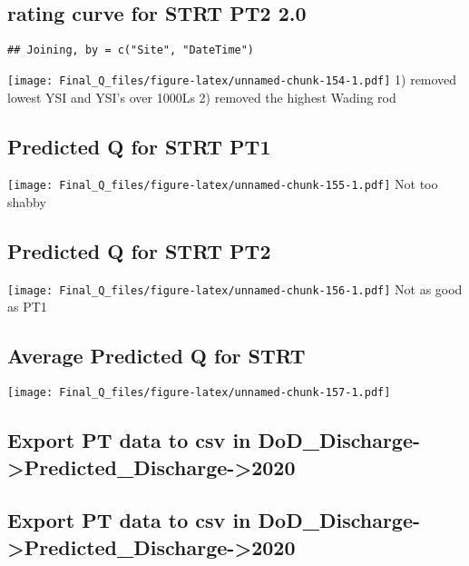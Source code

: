 \documentclass[
]{article}
\begin{document}
\hypertarget{rating-curve-for-strt-pt2-2.0}{%
\subsection{rating curve for STRT PT2
2.0}\label{rating-curve-for-strt-pt2-2.0}}

\begin{verbatim}
## Joining, by = c("Site", "DateTime")
\end{verbatim}

\texttt{[image: Final\_Q\_files/figure-latex/unnamed-chunk-154-1.pdf]} 1)
removed lowest YSI and YSI's over 1000Ls 2) removed the highest Wading
rod

\hypertarget{predicted-q-for-strt-pt1}{%
\subsection{Predicted Q for STRT PT1}\label{predicted-q-for-strt-pt1}}

\texttt{[image: Final\_Q\_files/figure-latex/unnamed-chunk-155-1.pdf]} Not
too shabby

\hypertarget{predicted-q-for-strt-pt2}{%
\subsection{Predicted Q for STRT PT2}\label{predicted-q-for-strt-pt2}}

\texttt{[image: Final\_Q\_files/figure-latex/unnamed-chunk-156-1.pdf]} Not
as good as PT1

\hypertarget{average-predicted-q-for-strt}{%
\subsection{Average Predicted Q for
STRT}\label{average-predicted-q-for-strt}}

\texttt{[image: Final\_Q\_files/figure-latex/unnamed-chunk-157-1.pdf]}

\hypertarget{export-pt-data-to-csv-in-dod_discharge-predicted_discharge-2020-4}{%
\subsection{Export PT data to csv in
DoD\_Discharge-\textgreater Predicted\_Discharge-\textgreater2020}\label{export-pt-data-to-csv-in-dod_discharge-predicted_discharge-2020-4}}

\hypertarget{export-pt-data-to-csv-in-dod_discharge-predicted_discharge-2020-5}{%
\subsection{Export PT data to csv in
DoD\_Discharge-\textgreater Predicted\_Discharge-\textgreater2020}\label{export-pt-data-to-csv-in-dod_discharge-predicted_discharge-2020-5}}
\end{document}
